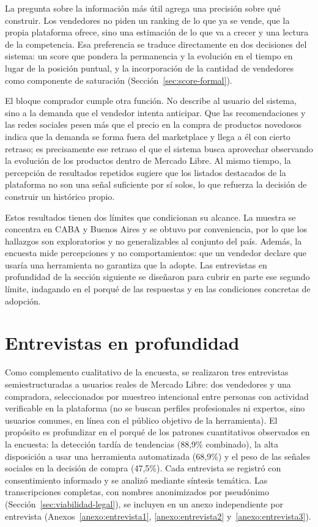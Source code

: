 La pregunta sobre la información más útil agrega una precisión sobre qué construir. Los vendedores no piden un ranking de lo que ya se vende, que la propia plataforma ofrece, sino una estimación de lo que va a crecer y una lectura de la competencia. Esa preferencia se traduce directamente en dos decisiones del sistema: un score que pondera la permanencia y la evolución en el tiempo en lugar de la posición puntual, y la incorporación de la cantidad de vendedores como componente de saturación (Sección~\ref{sec:score-formal}).

El bloque comprador cumple otra función. No describe al usuario del sistema, sino a la demanda que el vendedor intenta anticipar. Que las recomendaciones y las redes sociales pesen más que el precio en la compra de productos novedosos indica que la demanda se forma fuera del marketplace y llega a él con cierto retraso; es precisamente ese retraso el que el sistema busca aprovechar observando la evolución de los productos dentro de Mercado Libre. Al mismo tiempo, la percepción de resultados repetidos sugiere que los listados destacados de la plataforma no son una señal suficiente por sí solos, lo que refuerza la decisión de construir un histórico propio.

Estos resultados tienen dos límites que condicionan su alcance. La muestra se concentra en CABA y Buenos Aires y se obtuvo por conveniencia, por lo que los hallazgos son exploratorios y no generalizables al conjunto del país. Además, la encuesta mide percepciones y no comportamientos: que un vendedor declare que usaría una herramienta no garantiza que la adopte. Las entrevistas en profundidad de la sección siguiente se diseñaron para cubrir en parte ese segundo límite, indagando en el porqué de las respuestas y en las condiciones concretas de adopción.

\section{Entrevistas en profundidad}

Como complemento cualitativo de la encuesta, se realizaron tres entrevistas semiestructuradas a usuarios reales de Mercado Libre: dos vendedores y una compradora, seleccionados por muestreo intencional entre personas con actividad verificable en la plataforma (no se buscan perfiles profesionales ni expertos, sino usuarios comunes, en línea con el público objetivo de la herramienta). El propósito es profundizar en el porqué de los patrones cuantitativos observados en la encuesta: la detección tardía de tendencias (88,9\% combinado), la alta disposición a usar una herramienta automatizada (68,9\%) y el peso de las señales sociales en la decisión de compra (47,5\%). Cada entrevista se registró con consentimiento informado y se analizó mediante síntesis temática. Las transcripciones completas, con nombres anonimizados por pseudónimo (Sección~\ref{sec:viabilidad-legal}), se incluyen en un anexo independiente por entrevista (Anexos~\ref{anexo:entrevista1}, \ref{anexo:entrevista2} y~\ref{anexo:entrevista3}).

